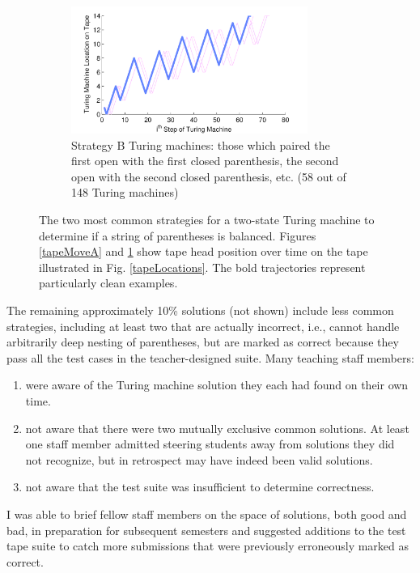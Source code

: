 \begin{figure}[p]
\begin{subfigure}[b]{1.0\textwidth}
\centering
\includegraphics[width=0.85\textwidth]{Body/figures/tmvisualization_NtoNParensMatched_allkidsAnno2}
\caption{Strategy B Turing machines: those which paired the first open with the first closed parenthesis, the second open with the second closed parenthesis, etc. (58 out of 148 Turing machines)}
\label{tapeMoveB}
\end{subfigure}

\caption{The two most common strategies for a two-state Turing machine to determine if a string of parentheses is balanced. Figures \ref{tapeMoveA} and \ref{tapeMoveB} show tape head position over time on the tape illustrated in Fig. \ref{tapeLocations}. The bold trajectories represent particularly clean examples.}
\label{turingFig}
\end{figure}

The remaining approximately 10\% solutions (not shown) include less common strategies, including at least two that are actually incorrect, i.e., cannot handle arbitrarily deep nesting of parentheses, but are marked as correct because they pass all the test cases in the teacher-designed suite. Many teaching staff members:
\begin{enumerate}
\item were aware of the Turing machine solution they each had found on their own time.
\item not aware that there were two mutually exclusive common solutions. At least one staff member admitted steering students away from solutions they did not recognize, but in retrospect may have indeed been valid solutions.
\item not aware that the test suite was insufficient to determine correctness.
\end{enumerate}

I was able to brief fellow staff members on the space of solutions, both good and bad, in preparation for subsequent semesters and suggested additions to the test tape suite to catch more submissions that were previously erroneously marked as correct.

